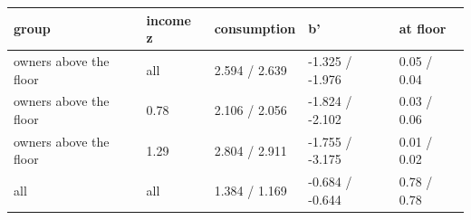 \begingroup\small
\setlength{\tabcolsep}{3pt}
\renewcommand{\arraystretch}{1.04}
\begin{tabularx}{\linewidth}{XXXXX}
\toprule
group & income z & consumption & b' & at floor \\
\midrule
owners above the floor & all & 2.594 / 2.639 & -1.325 / -1.976 & 0.05 / 0.04 \\
owners above the floor & 0.78 & 2.106 / 2.056 & -1.824 / -2.102 & 0.03 / 0.06 \\
owners above the floor & 1.29 & 2.804 / 2.911 & -1.755 / -3.175 & 0.01 / 0.02 \\
all & all & 1.384 / 1.169 & -0.684 / -0.644 & 0.78 / 0.78 \\
\bottomrule
\end{tabularx}
\endgroup

